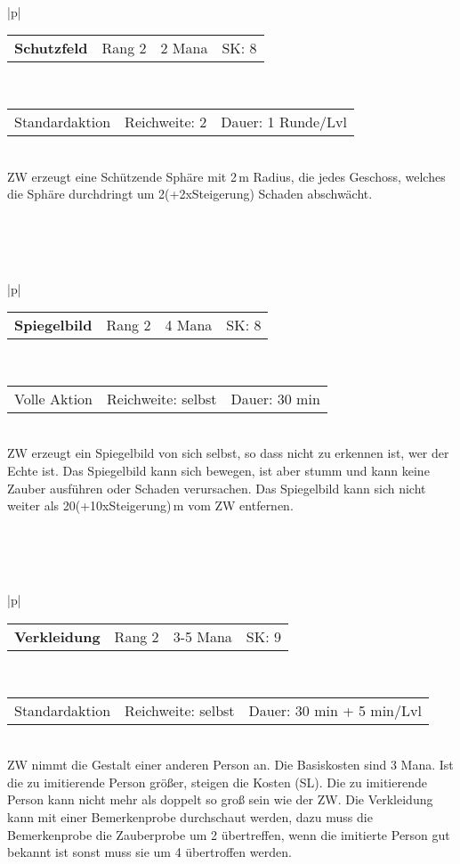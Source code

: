 \documentclass[../../Heldenanleitung2]{subfiles}
\begin{document}
\\\\\\
\begin{tabular}{|p{\textwidth}|}
\hline
\begin{tabularx}{\textwidth}{X|X|X|X}
\textbf{Schutzfeld} & Rang 2 & 2 Mana & SK: 8
\end{tabularx} \\ \hline
\begin{tabularx}{\textwidth}{X|X|X}
Standardaktion & Reichweite: 2 & Dauer: 1 Runde/Lvl
\end{tabularx} \\ \hline
ZW erzeugt eine Schützende Sphäre mit 2\,m Radius, die jedes Geschoss, welches die Sphäre durchdringt um 2(+2xSteigerung) Schaden abschwächt.
\\ \hline
\end{tabular}
\\\\\\
\begin{tabular}{|p{\textwidth}|}
\hline
\begin{tabularx}{\textwidth}{X|X|X|X}
\textbf{Spiegelbild} & Rang 2 & 4 Mana & SK: 8
\end{tabularx} \\ \hline
\begin{tabularx}{\textwidth}{X|X|X}
Volle Aktion & Reichweite: selbst & Dauer: 30 min
\end{tabularx} \\ \hline
ZW erzeugt ein Spiegelbild von sich selbst, so dass nicht zu erkennen ist, wer der Echte ist. Das Spiegelbild kann sich bewegen, ist aber stumm und kann keine Zauber ausführen oder Schaden verursachen. Das Spiegelbild kann sich nicht weiter als 20(+10xSteigerung)\,m vom ZW entfernen.
\\ \hline
\end{tabular}
\\\\\\
\begin{tabular}{|p{\textwidth}|}
\hline
\begin{tabularx}{\textwidth}{X|X|X|X}
\textbf{Verkleidung} & Rang 2 & 3-5 Mana & SK: 9
\end{tabularx} \\ \hline
\begin{tabularx}{\textwidth}{X|X|X}
Standardaktion & Reichweite: selbst & Dauer: 30 min + 5 min/Lvl
\end{tabularx} \\ \hline
ZW nimmt die Gestalt einer anderen Person an. Die Basiskosten sind 3 Mana. Ist die zu imitierende Person größer, steigen die Kosten (SL). Die zu imitierende Person kann nicht mehr als doppelt so groß sein wie der ZW. Die Verkleidung kann mit einer Bemerkenprobe durchschaut werden, dazu muss die Bemerkenprobe die Zauberprobe um 2 übertreffen, wenn die imitierte Person gut bekannt ist sonst muss sie um 4 übertroffen werden.
\\ \hline
\end{tabular}
\end{document}
